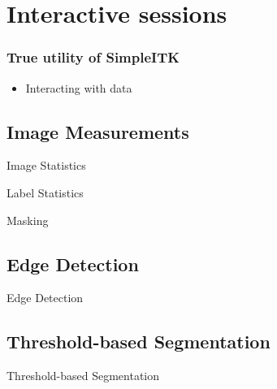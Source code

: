 \section{Interactive sessions}

\begin{frame}
\frametitle{True utility of SimpleITK}
\begin{itemize}
\item Interacting with data
\end{itemize}
\end{frame}

\subsection{Image Measurements}
\begin{frame}{Image Statistics}
\end{frame}

\begin{frame}{Label Statistics}
\end{frame}

\begin{frame}{Masking}
\end{frame}


\subsection{Edge Detection}
\begin{frame}{Edge Detection}
\end{frame}

\subsection{Threshold-based Segmentation}
\begin{frame}{Threshold-based Segmentation}
\end{frame}




